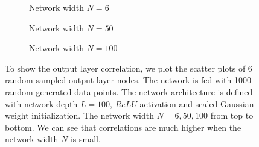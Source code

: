 \begin{figure}
  \centering
  \newcommand{\myWidth}{.95\textwidth}
  \begin{subfigure}{\myWidth}
    \centering
    \caption{Network width $N=6$}
    \label{fig:sec4_sim12_a}
  \end{subfigure}%
  
  \begin{subfigure}{\myWidth}
    \centering
    \caption{Network width $N=50$}
    \label{fig:sec4_sim12_b}
  \end{subfigure}%
  
  \begin{subfigure}{\myWidth}
    \centering
    \caption{Network width $N=100$}
    \label{fig:sec4_sim12_c}
  \end{subfigure}%
  
\caption[Scatter plots for the $ReLU$ activation and the scaled-Gaussian initialization.]
{To show the output layer correlation, we plot the scatter plots of 6 random sampled output
layer nodes. The network is fed with 1000 random generated data points.
The network architecture is defined with network depth $L=100$,
$ReLU$ activation and scaled-Gaussian weight initialization. The network width
$N=6, 50, 100$ from top to bottom. We can see that correlations are much higher
when the network width $N$ is small.}
\label{fig:sec4_sim12}
\end{figure}

